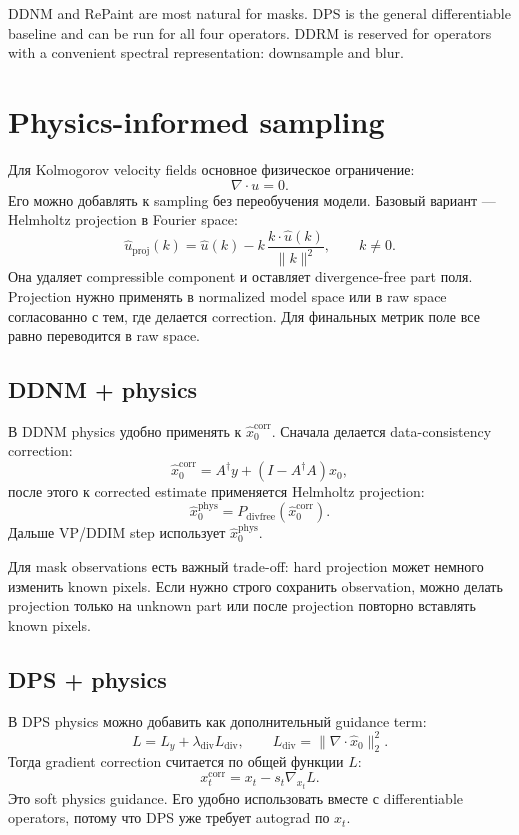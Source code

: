 \documentclass[10pt]{article}
\newcommand{\norm}[1]{\lVert#1\rVert}
\begin{document}
DDNM and RePaint are most natural for masks. DPS is the general differentiable
baseline and can be run for all four operators. DDRM is reserved for operators with
a convenient spectral representation: downsample and blur.

\section{Physics-informed sampling}

Для Kolmogorov velocity fields основное физическое ограничение:
\[
    \nabla\cdot u = 0.
\]
Его можно добавлять к sampling без переобучения модели. Базовый вариант --- Helmholtz
projection в Fourier space:
\[
    \hat u_{\mathrm{proj}}(k)
    =
    \hat u(k)
    -
    k\,\frac{k\cdot \hat u(k)}{\norm{k}^2},
    \qquad k\ne0.
\]
Она удаляет compressible component и оставляет divergence-free part поля. Projection
нужно применять в normalized model space или в raw space согласованно с тем, где делается
correction. Для финальных метрик поле все равно переводится в raw space.

\subsection{DDNM + physics}

В DDNM physics удобно применять к \(\hat x_0^{\mathrm{corr}}\). Сначала делается
data-consistency correction:
\[
    \hat x_0^{\mathrm{corr}}
    =
    A^\dagger y + (I-A^\dagger A)\hat x_0,
\]
после этого к corrected estimate применяется Helmholtz projection:
\[
    \hat x_0^{\mathrm{phys}} = P_{\mathrm{divfree}}(\hat x_0^{\mathrm{corr}}).
\]
Дальше VP/DDIM step использует \(\hat x_0^{\mathrm{phys}}\).

Для mask observations есть важный trade-off: hard projection может немного изменить known
pixels. Если нужно строго сохранить observation, можно делать projection только на unknown
part или после projection повторно вставлять known pixels.

\subsection{DPS + physics}

В DPS physics можно добавить как дополнительный guidance term:
\[
    L = L_y + \lambda_{\mathrm{div}} L_{\mathrm{div}},
    \qquad
    L_{\mathrm{div}} = \norm{\nabla\cdot \hat x_0}_2^2.
\]
Тогда gradient correction считается по общей функции \(L\):
\[
    x_t^{\mathrm{corr}}
    =
    x_t - s_t \nabla_{x_t}L.
\]
Это soft physics guidance. Его удобно использовать вместе с differentiable operators,
потому что DPS уже требует autograd по \(x_t\).
\end{document}
